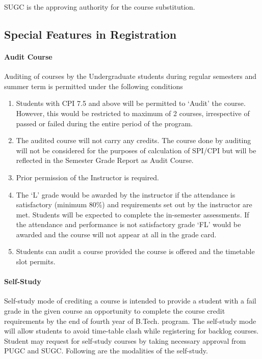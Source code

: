 SUGC is the approving authority for the course substitution.

\subsection{Special Features in Registration}

\paragraph{Audit Course} Auditing of courses by the Undergraduate students during regular semesters and summer term is permitted under the following conditions

\begin{enumerate}[leftmargin=15mm]
    \item Students with CPI 7.5 and above will be permitted to ‘Audit' the course. However, this would be restricted to maximum of 2 courses, irrespective of passed or failed during the entire period of the program. 
    \item The audited course will not carry any credits. The course done by auditing will not be considered for the purposes of calculation of SPI/CPI but will be reflected in the Semester Grade Report as Audit Course. 
    \item Prior permission of the Instructor is required. 
    \item The ‘L' grade would be awarded by the instructor if the attendance is satisfactory (minimum 80\%) and requirements set out by the instructor are met. Students will be expected to complete the in-semester assessments. If the attendance and performance is not satisfactory grade ‘FL’ would be awarded and the course will not appear at all in the grade card. 
    \item Students can audit a course provided the course is offered and the timetable slot permits. 
\end{enumerate}

\paragraph{Self-Study} Self-study mode of crediting a course is intended to provide a student with a fail grade in the given course an opportunity to complete the course credit requirements by the end of fourth year of B.Tech. program. The self-study mode will allow students to avoid time-table clash while registering for backlog courses. Student may request for self-study courses by taking necessary approval from PUGC and SUGC. Following are the modalities of the self-study.

